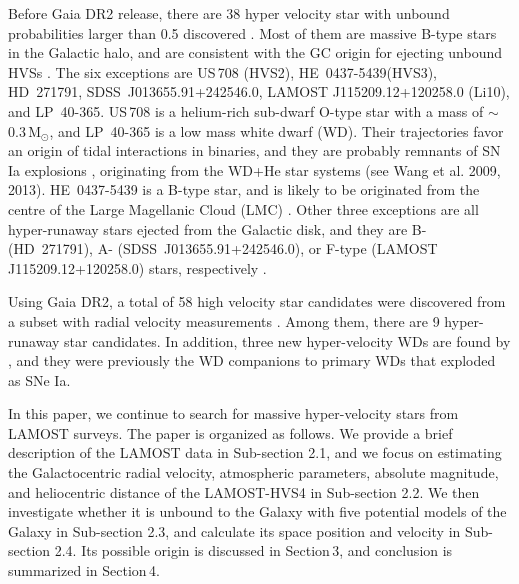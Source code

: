 \documentclass[iop, aj]{emulateapj}
\begin{document}
Before Gaia DR2 release, there are 38 hyper velocity star with unbound probabilities larger than 0.5 discovered \citep{2005ApJ...622L..33B, 2005A&A...444L..61H, 2005ApJ...634L.181E, 2006ApJ...647..303B, 2008A&A...483L..21H, 2009ApJ...690.1639B, 2009A&A...507L..37T, 2010ApJ...711..138I, 2012ApJ...744L..24L, 2012ApJ...751...55B, 2014ApJ...787...89B, 2014ApJ...785L..23Z, 2015RAA....15.1364L, 2017ApJ...847L...9H, 2017Sci...357..680V, 2018Boubert}. Most of them are massive B-type stars in the Galactic halo, and are consistent with the GC origin for ejecting unbound HVSs \citep{2015ARA&A..53...15B}. The six exceptions are US\,708 (HVS2), HE~0437-5439(HVS3), HD~271791, SDSS~J013655.91+242546.0, LAMOST J115209.12+120258.0 (Li10), and LP~40-365. US\,708 is a helium-rich sub-dwarf O-type star with a mass of $\sim$\,0.3\,M$_{\odot}$, and LP~40-365 is a low mass white dwarf (WD). Their trajectories favor an origin of tidal interactions in binaries, and they are probably remnants of SN Ia explosions \citep{2015Sci...347.1126G, 2017Sci...357..680V}, originating from the WD+He star systems (see Wang et al. 2009, 2013). HE~0437-5439 is a B-type star, and is likely to be originated from the centre of the Large Magellanic Cloud (LMC) \citep{2018Erkal}. Other three exceptions are all hyper-runaway stars ejected from the Galactic disk, and they are B- (HD~271791), A- (SDSS~J013655.91+242546.0), or F-type (LAMOST J115209.12+120258.0) stars, respectively \citep{2008A&A...483L..21H, 2009A&A...507L..37T, 2015RAA....15.1364L}.

Using Gaia DR2, a total of 58 high velocity star candidates were discovered from a subset with radial velocity measurements \citep{2018Marchetti, 2018Hattori}. Among them, there are 9 hyper-runaway star candidates. In addition, three new hyper-velocity WDs are found by \citet{2018Shen}, and they were previously the WD companions to primary WDs that exploded as SNe Ia.

In this paper, we continue to search for massive hyper-velocity stars from LAMOST surveys. The paper is organized as follows. We provide a brief description of the LAMOST data in Sub-section 2.1, and we focus on estimating the Galactocentric radial velocity, atmospheric parameters, absolute magnitude, and heliocentric distance of the LAMOST-HVS4 in Sub-section 2.2. We then investigate whether it is unbound to the Galaxy with five potential models of the Galaxy in Sub-section 2.3, and calculate its space position and velocity in Sub-section 2.4. Its possible origin is discussed in Section\,3, and conclusion is summarized in Section\,4.
\end{document}
